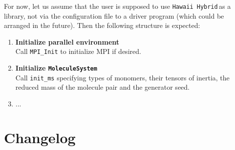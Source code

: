 \documentclass{article}
\newcommand{\libname}{\texttt{Hawaii Hybrid}\,}
\begin{document}
For now, let us assume that the user is supposed to use \libname as a library, not via the configuration file to a driver program (which could be arranged in the future). Then the following structure is expected:

\begin{enumerate}

\item \textbf{Initialize parallel environment} \\
Call \texttt{MPI\_Init} to initialize MPI if desired.

\item \textbf{Initialize \texttt{MoleculeSystem}} \\
Call \texttt{init\_ms} specifying types of monomers, their tensors of inertia, the reduced mass of the molecule pair and the generator seed.

\item ...

\end{enumerate}

\printbibliography[heading=bibintoc]



\section{Changelog}
\label{sec:changelog}
\end{document}
